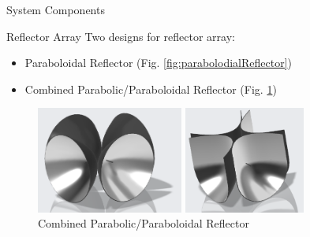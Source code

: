 \documentclass{beamer}
\begin{document}
\begin{frame}{System Components}
    \begin{block}{Reflector Array}
    Two designs for reflector array:
    \begin{itemize}
      \item Paraboloidal Reflector (Fig. \ref{fig:parabolodialReflector})
      \item Combined Parabolic/Paraboloidal Reflector (Fig. \ref{fig:parabolicReflector})
    \end{itemize}
    \end{block}
    \begin{figure}
      \centering
      \begin{minipage}[t]{0.5\textwidth}
        \centering
        \includegraphics[height=3.5cm]{figs/img/paraboloidalReflector}
        \caption{Paraboloidal Reflector Model}
        \label{fig:parabolodialReflector}
      \end{minipage}
      \begin{minipage}[t]{0.4\textwidth}
        \centering
        \includegraphics[height=3.5cm]{figs/img/parabolicReflector}
        \caption{Combined Parabolic/Paraboloidal Reflector}
        \label{fig:parabolicReflector}
      \end{minipage}
    \end{figure}
\end{frame}
\end{document}
